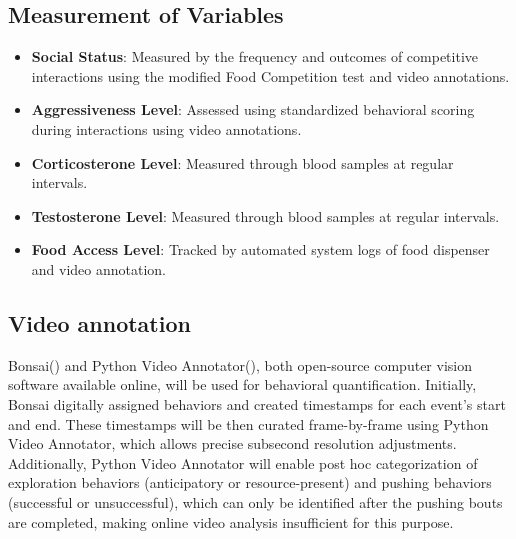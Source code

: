 \documentclass[english, a4paper, 11pt]{article}
\begin{document}
\subsection*{Measurement of Variables}

\begin{itemize}
    \item \textbf{Social Status}: Measured by the frequency and outcomes of competitive interactions using the modified Food Competition test and video annotations.
    \item \textbf{Aggressiveness Level}: Assessed using standardized behavioral scoring during interactions using video annotations.
    \item \textbf{Corticosterone Level}: Measured through blood samples at regular intervals.
    \item \textbf{Testosterone Level}: Measured through blood samples at regular intervals.
    \item \textbf{Food Access Level}: Tracked by automated system logs of food dispenser and video annotation.
\end{itemize}

\subsection*{Video annotation}
Bonsai(\cite{lopesBonsaiEventbasedFramework2015}) and Python Video Annotator(\cite{ribeiroPythonvideoannotator}), both open-source computer vision software available online, will be used for behavioral quantification. Initially, Bonsai digitally assigned behaviors and created timestamps for each event's start and end. These timestamps will be then curated frame-by-frame using Python Video Annotator, which allows precise subsecond resolution adjustments. Additionally, Python Video Annotator will enable post hoc categorization of exploration behaviors (anticipatory or resource-present) and pushing behaviors (successful or unsuccessful), which can only be identified after the pushing bouts are completed, making online video analysis insufficient for this purpose.
\end{document}

